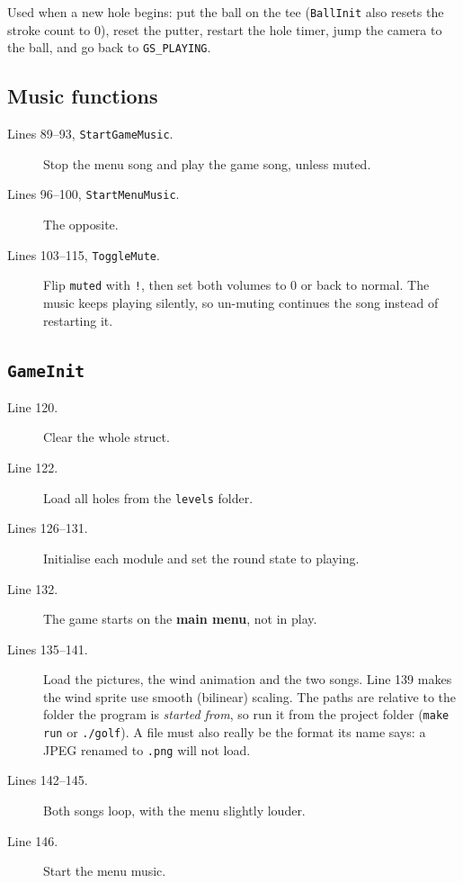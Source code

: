 \documentclass[11pt,a4paper]{article}
\newcommand{\code}[3]{}
\begin{document}
\code{main.c}{79}{86}

Used when a new hole begins: put the ball on the tee (\texttt{BallInit} also resets the stroke count to 0), reset the
putter, restart the hole timer, jump the camera to the ball, and go back to \texttt{GS\_PLAYING}.

\subsection{Music functions}

\code{main.c}{89}{115}

\begin{description}
  \item[Lines 89--93, \texttt{StartGameMusic}.] Stop the menu song and play the game song, unless muted.
  \item[Lines 96--100, \texttt{StartMenuMusic}.] The opposite.
  \item[Lines 103--115, \texttt{ToggleMute}.] Flip \texttt{muted} with \texttt{!}, then set both volumes to 0 or back to
  normal. The music keeps playing silently, so un-muting continues the song instead of restarting it.
\end{description}

\subsection{\texttt{GameInit}}

\code{main.c}{118}{147}

\begin{description}
  \item[Line 120.] Clear the whole struct.
  \item[Line 122.] Load all holes from the \texttt{levels} folder.
  \item[Lines 126--131.] Initialise each module and set the round state to playing.
  \item[Line 132.] The game starts on the \textbf{main menu}, not in play.
  \item[Lines 135--141.] Load the pictures, the wind animation and the two songs. Line 139 makes the wind sprite use smooth (bilinear) scaling. The paths are relative to the folder the program is
  \emph{started from}, so run it from the project folder (\texttt{make run} or \texttt{./golf}). A file must also really
  be the format its name says: a JPEG renamed to \texttt{.png} will not load.
  \item[Lines 142--145.] Both songs loop, with the menu slightly louder.
  \item[Line 146.] Start the menu music.
\end{description}
\end{document}
